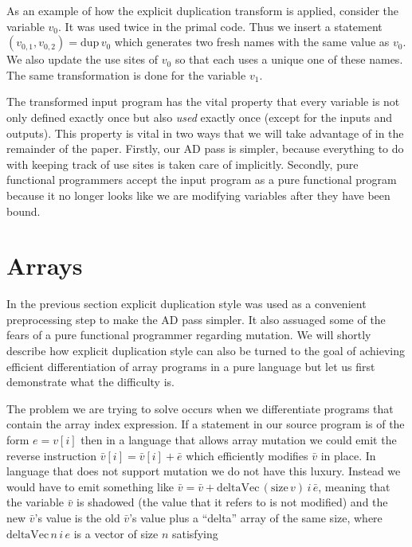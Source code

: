 \documentclass[12pt]{article}
\begin{document}
As an example of how the explicit duplication transform is applied,
consider the variable $v_0$.  It was used twice in the primal code.
Thus we insert a statement $(v_{0,1}, v_{0,2}) = \mathrm{dup} \, v_0$
which generates two fresh names with the same value as $v_0$.  We also
update the use sites of $v_0$ so that each uses a unique one of these
names.  The same transformation is done for the variable $v_1$.

The transformed input program has the vital property that every
variable is not only defined exactly once but also \emph{used} exactly
once (except for the inputs and outputs).  This property is vital in
two ways that we will take advantage of in the remainder of the paper.
Firstly, our AD pass is simpler, because everything to do with keeping
track of use sites is taken care of implicitly.  Secondly, pure
functional programmers accept the input program as a pure functional
program because it no longer looks like we are modifying variables
after they have been bound.

\section{Arrays}

In the previous section explicit duplication style was used as a
convenient preprocessing step to make the AD pass simpler.  It also
assuaged some of the fears of a pure functional programmer regarding
mutation.  We will shortly describe how explicit duplication style can
also be turned to the goal of achieving efficient differentiation of
array programs in a pure language but let us first demonstrate what
the difficulty is.

The problem we are trying to solve occurs when we differentiate
programs that contain the array index expression.  If a statement in
our source program is of the form $e = v[i]$ then in a language that
allows array mutation we could emit the reverse instruction
$\bar{v}[i] = \bar{v}[i] + \bar{e}$ which efficiently modifies
$\bar{v}$ in place.  In language that does not support mutation we do
not have this luxury.  Instead we would have to emit something like
$\bar{v} = \bar{v} + \textrm{deltaVec} \, (\textrm{size} \, v) \, i \,
\bar{e}$, meaning that the variable $\bar{v}$ is shadowed (the value
that it refers to is not modified) and the new $\bar{v}$'s value is the old
$\bar{v}$'s value plus a ``delta'' array of the same size, where
$\textrm{deltaVec} \, n \, i \, e$ is a vector of size $n$ satisfying
\end{document}
